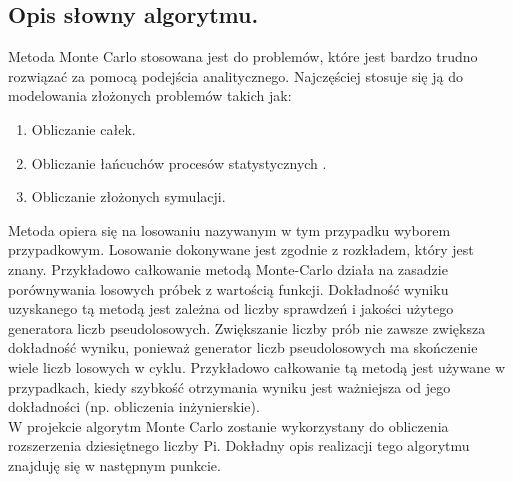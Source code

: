 \documentclass[a4paper,12pt]{article}		%
\begin{document}
\subsection{Opis słowny algorytmu.}
Metoda Monte Carlo stosowana jest do problemów, które jest bardzo trudno rozwiązać za pomocą podejścia analitycznego. Najczęściej stosuje się ją do modelowania złożonych problemów takich jak: 
\begin{enumerate}
\item Obliczanie całek.
\item Obliczanie łańcuchów procesów statystycznych .
\item Obliczanie złożonych symulacji.
\end{enumerate}
Metoda opiera się na losowaniu nazywanym w tym przypadku wyborem przypadkowym. Losowanie dokonywane jest zgodnie z rozkładem, który jest znany. Przykładowo całkowanie metodą Monte-Carlo działa na zasadzie porównywania losowych próbek z wartością funkcji. Dokładność wyniku uzyskanego tą metodą jest zależna od liczby sprawdzeń i jakości użytego generatora liczb pseudolosowych. Zwiększanie liczby prób nie zawsze zwiększa dokładność wyniku, ponieważ generator liczb pseudolosowych ma skończenie wiele liczb losowych w cyklu. Przykładowo całkowanie tą metodą jest używane w przypadkach, kiedy szybkość otrzymania wyniku jest ważniejsza od jego dokładności (np. obliczenia inżynierskie).\\

W projekcie algorytm Monte Carlo zostanie wykorzystany do obliczenia rozszerzenia dziesiętnego liczby Pi. Dokładny opis realizacji tego algorytmu znajduję się w następnym punkcie.
\end{document}
